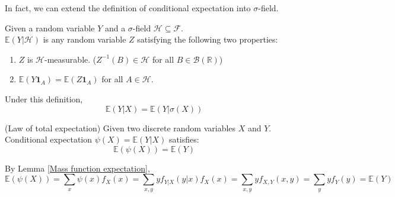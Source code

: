\documentclass{huhtakm-template-book}
\newcommand{\expect}{\mathbb{E}}
\begin{document}
\newpage
In fact, we can extend the definition of conditional expectation into $\sigma$-field.
\begin{defn}
	Given a random variable $Y$ and a $\sigma$-field $\mathcal{H}\subseteq\mathcal{F}$.\\
	$\expect(Y|\mathcal{H})$ is any random variable $Z$ satisfying the following two properties:
	\begin{enumerate}
		\item $Z$ is $\mathcal{H}$-measurable. ($Z^{-1}(B)\in\mathcal{H}$ for all $B\in\mathcal{B}(\mathbb{R})$)
		\item $\expect(Y\mathbf{1}_{A})=\expect(Z\mathbf{1}_{A})$ for all $A\in\mathcal{H}$.
	\end{enumerate}
\end{defn}
\begin{rem}
	Under this definition,
	\begin{equation*}
		\expect(Y|X)=\expect(Y|\sigma(X))
	\end{equation*}
\end{rem}
\begin{thm}(Law of total expectation)
	Given two discrete random variables $X$ and $Y$. Conditional expectation $\psi(X)=\expect(Y|X)$ satisfies:
	\begin{equation*}
		\expect(\psi(X))=\expect(Y)
	\end{equation*}
\end{thm}
\begin{proofing}
	By Lemma \ref{Mass function expectation},
	\begin{equation*}
		\expect(\psi(X))=\sum_{x}\psi(x)f_{X}(x)=\sum_{x,y}yf_{Y|X}(y|x)f_{X}(x)=\sum_{x,y}yf_{X,Y}(x,y)=\sum_{y}yf_{Y}(y)=\expect(Y)
	\end{equation*}
\end{proofing}
\end{document}
